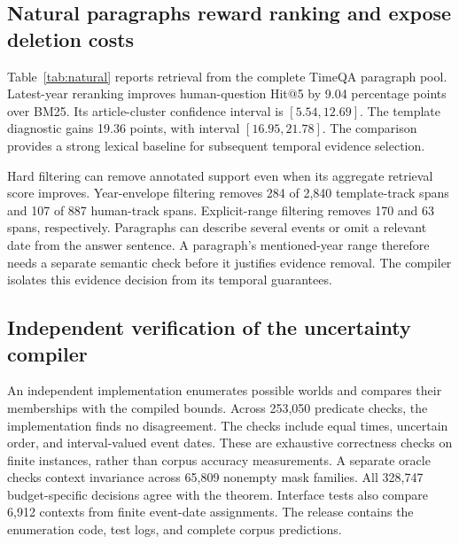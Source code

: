 \subsection{Natural paragraphs reward ranking and expose deletion costs}

Table~\ref{tab:natural} reports retrieval from the complete TimeQA paragraph pool.
Latest-year reranking improves human-question Hit@5 by 9.04 percentage points over BM25.
Its article-cluster confidence interval is $[5.54,12.69]$.
The template diagnostic gains 19.36 points, with interval $[16.95,21.78]$.
The comparison provides a strong lexical baseline for subsequent temporal evidence selection.


Hard filtering can remove annotated support even when its aggregate retrieval score improves.
Year-envelope filtering removes 284 of 2,840 template-track spans and 107 of 887 human-track spans.
Explicit-range filtering removes 170 and 63 spans, respectively.
Paragraphs can describe several events or omit a relevant date from the answer sentence.
A paragraph's mentioned-year range therefore needs a separate semantic check before it justifies evidence removal.
The compiler isolates this evidence decision from its temporal guarantees.

\subsection{Independent verification of the uncertainty compiler}

An independent implementation enumerates possible worlds and compares their memberships with the compiled bounds.
Across 253,050 predicate checks, the implementation finds no disagreement.
The checks include equal times, uncertain order, and interval-valued event dates.
These are exhaustive correctness checks on finite instances, rather than corpus accuracy measurements.
A separate oracle checks context invariance across 65,809 nonempty mask families.
All 328,747 budget-specific decisions agree with the theorem.
Interface tests also compare 6,912 contexts from finite event-date assignments.
The release contains the enumeration code, test logs, and complete corpus predictions.
